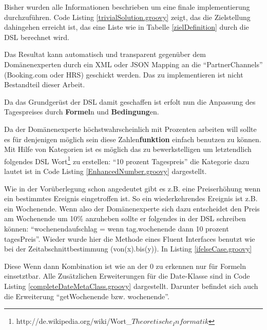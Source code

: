 \documentclass[11pt,english,ngerman, headsepline]{scrreprt}
\begin{document}
Bisher wurden alle Informationen beschrieben um eine finale implementierung
durchzuführen. Code Listing \ref{trivialSolution.groovy} zeigt, das die
Zielstellung dahingehen erreicht ist, das eine Liste wie in Tabelle \ref{zielDefinition} durch
die DSL berechnet wird.
 


Das Resultat kann automatisch und transparent gegenüber dem Domänenexperten
durch ein XML oder JSON Mapping an die ``PartnerChannels'' (Booking.com oder HRS) geschickt werden.
Das zu implementieren ist nicht Bestandteil dieser Arbeit.

Da das Grundgerüst der DSL damit geschaffen ist erfolt nun die Anpassung des
Tagespreises durch {\bf Formel}n und {\bf Bedingung}en.

Da der Domänenexperte höchstwahrscheinlich mit Prozenten arbeiten will sollte
es für denjenigen möglich sein diese Zahlen{\bf funktion} einfach benutzen zu
können. Mit Hilfe von Kategorien ist es möglich das zu bewerkstelligen um
letztendlich folgendes DSL
Wort\footnote{http://de.wikipedia.org/wiki/Wort\_\(Theoretische_Informatik\)}
zu erstellen: ``10 prozent Tagespreis''
die Kategorie dazu lautet ist in Code Listing \ref{EnhancedNumber.groovy}
dargestellt.
 


Wie in der Vorüberlegung schon angedeutet gibt es z.B. eine Preiserhöhung wenn
ein bestimmtes Ereignis eingetroffen ist. So ein wiederkehrendes
Ereignis ist z.B. ein Wochenende. Wenn also der Domänenexperte sich dazu
entscheidet den Preis am Wochenende um 10\% anzuheben sollte er folgendes in der
DSL schreiben können: ``wochenendaufschlag = wenn tag.wochenende dann 10 prozent
tagesPreis''. Wieder wurde hier die Methode eines Fluent Interfaces benutzt wie
bei der Zeitabschnittbestimmung (von(x).bis(y)). In Listing
\ref{ifelseCase.groovy}
 


Diese Wenn dann Kombination ist wie an der 0 zu erkennen nur für Formeln
einsetztbar. 
Alle Zusätzlichen Erweiterungen für die Date-Klasse sind in Code Listing
\ref{completeDateMetaClass.groovy} dargestellt. Darunter befindet sich auch die
Erweiterung ``getWochenende bzw. wochenende''.
\end{document}
